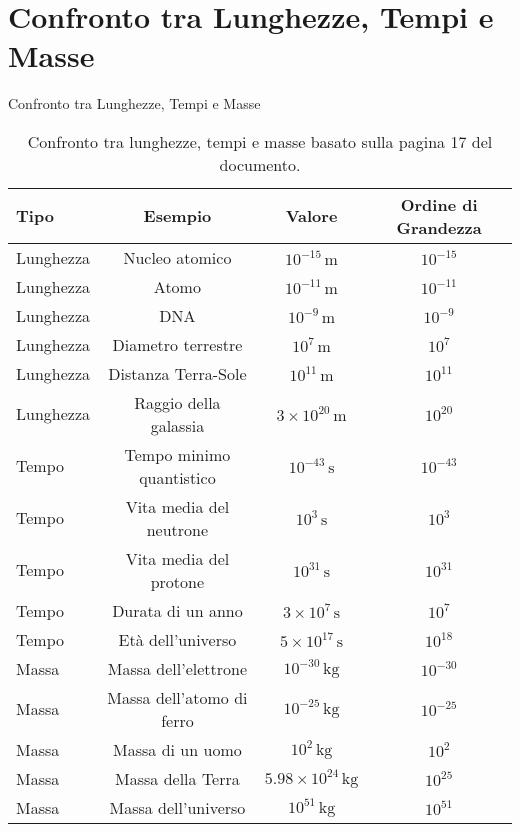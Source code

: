 \documentclass[9pt]{beamer}
\begin{document}
\section{Confronto tra Lunghezze, Tempi e Masse}
\begin{frame}{Confronto tra Lunghezze, Tempi e Masse}
\small
    \begin{table}[h!]
        \centering
        \begin{tabular}{|l|c|c|c|}
            \hline
            \textbf{Tipo} & \textbf{Esempio} & \textbf{Valore} & \textbf{Ordine di Grandezza} \\
            \hline
            Lunghezza & Nucleo atomico & $10^{-15} \, \mathrm{m}$ & $10^{-15}$ \\
            Lunghezza & Atomo & $10^{-11} \, \mathrm{m}$ & $10^{-11}$ \\
            Lunghezza & DNA & $10^{-9} \, \mathrm{m}$ & $10^{-9}$ \\
            Lunghezza & Diametro terrestre & $10^{7} \, \mathrm{m}$ & $10^{7}$ \\
            Lunghezza & Distanza Terra-Sole & $10^{11} \, \mathrm{m}$ & $10^{11}$ \\
            Lunghezza & Raggio della galassia & $3 \times 10^{20} \, \mathrm{m}$ & $10^{20}$ \\
            \hline
            Tempo & Tempo minimo quantistico & $10^{-43} \, \mathrm{s}$ & $10^{-43}$ \\
            Tempo & Vita media del neutrone & $10^{3} \, \mathrm{s}$ & $10^{3}$ \\
            Tempo & Vita media del protone & $10^{31} \, \mathrm{s}$ & $10^{31}$ \\
            Tempo & Durata di un anno & $3 \times 10^{7} \, \mathrm{s}$ & $10^{7}$ \\
            Tempo & Età dell'universo & $5 \times 10^{17} \, \mathrm{s}$ & $10^{18}$ \\
            \hline
            Massa & Massa dell'elettrone & $10^{-30} \, \mathrm{kg}$ & $10^{-30}$ \\
            Massa & Massa dell'atomo di ferro & $10^{-25} \, \mathrm{kg}$ & $10^{-25}$ \\
            Massa & Massa di un uomo & $10^{2} \, \mathrm{kg}$ & $10^{2}$ \\
            Massa & Massa della Terra & $5.98 \times 10^{24} \, \mathrm{kg}$ & $10^{25}$ \\
            Massa & Massa dell'universo & $10^{51} \, \mathrm{kg}$ & $10^{51}$ \\
            \hline
        \end{tabular}
        \caption{Confronto tra lunghezze, tempi e masse basato sulla pagina 17 del documento.}
    \end{table}
\end{frame}
\end{document}
